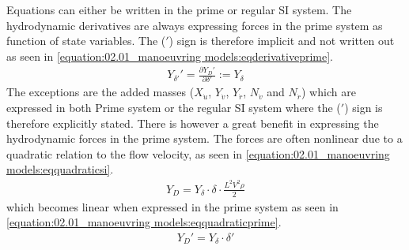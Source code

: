 \sphinxAtStartPar
Equations can either be written in the prime or regular SI system. The hydrodynamic derivatives are always expressing forces in the prime system as function of state variables. The (\('\)) sign is therefore implicit and not written out as seen in \autoref{equation:02.01_manoeuvring models:eqderivativeprime}.
\begin{equation}\label{equation:02.01_manoeuvring models:eqderivativeprime}
\begin{split}\displaystyle Y_{\delta'}'=\frac{\partial Y_D'}{\partial \delta'} := Y_{\delta} \end{split}
\end{equation}
\sphinxAtStartPar
The exceptions are the added masses (\(X_{\dot{u}}\), \(Y_{\dot{v}}\), \(Y_{\dot{r}}\), \(N_{\dot{v}}\) and \(N_{\dot{r}}\)) which are expressed in both Prime system or the regular SI system where the (\('\)) sign is therefore
explicitly stated.
There is however a great benefit in expressing the hydrodynamic forces in the prime system. The forces are often nonlinear due to a quadratic relation to the flow velocity, as seen in \autoref{equation:02.01_manoeuvring models:eqquadraticsi}.
\begin{equation}\label{equation:02.01_manoeuvring models:eqquadraticsi}
\begin{split}\displaystyle Y_{D}=Y_{\delta} \cdot \delta \cdot \frac{L^2V^2\rho}{2}\end{split}
\end{equation}
which becomes linear when expressed in the prime system as seen in \autoref{equation:02.01_manoeuvring models:eqquadraticprime}.
\begin{equation}\label{equation:02.01_manoeuvring models:eqquadraticprime}
\begin{split}\displaystyle Y_{D}'=Y_{\delta} \cdot \delta'\end{split}
\end{equation}


